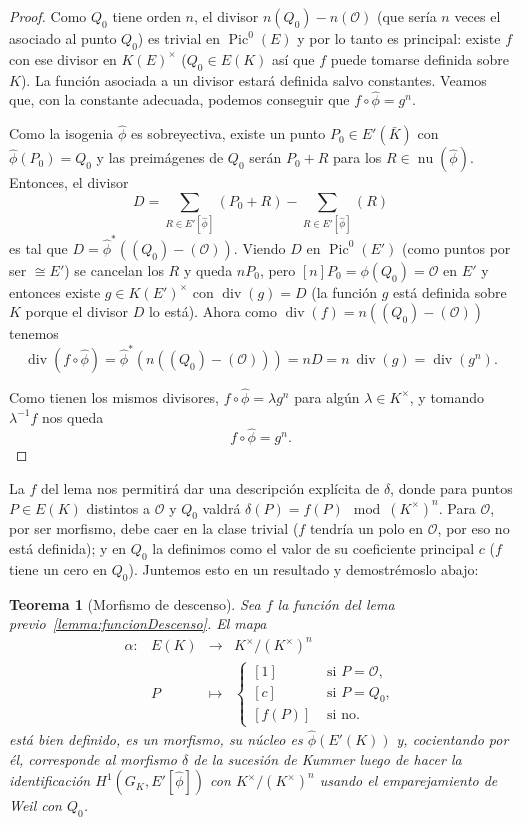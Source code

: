 \documentclass[a4paper]{book}
\theoremstyle{definition}
\theoremstyle{plain}
\newtheorem{theorem}[definition]{Teorema}
\DeclareMathOperator{\nuc}{nu}
\newcommand{\OO}{\mathcal{O}}
\newcommand{\KmodN}{K^\times/{(K^\times)}^n}
\begin{document}
\begin{proof}
Como $Q_0$ tiene orden $n$, el divisor $n(Q_0)- n(\OO)$ (que sería $n$ veces el asociado al punto $Q_0$) es trivial en $\operatorname{Pic}^0(E)$ y por lo tanto es principal: existe $f$ con ese divisor en ${K(E)}^\times$ ($Q_0\in E(K)$ así que $f$ puede tomarse definida sobre $K$). La función asociada a un divisor estará definida salvo constantes. Veamos que, con la constante adecuada, podemos conseguir que $f\circ\hat\phi=g^n$.

Como la isogenia $\hat\phi$ es sobreyectiva, existe un punto $P_0 \in E'(\bar{K})$ con $\hat\phi(P_0)=Q_0$ y las preimágenes de $Q_0$ serán $P_0 + R$ para los $R\in \nuc (\hat\phi)$. Entonces, el divisor 
\[ 
D = \sum_{R\in E'[\hat\phi]} (P_0 + R) - \sum_{R\in E'[\hat\phi]} (R) 
\] 
es tal que $D = \hat\phi^*((Q_0)-(\OO))$. Viendo $D$ en $\operatorname{Pic}^0(E')$ (como puntos por ser $\cong E'$) se cancelan los $R$ y queda $nP_0$, pero $[n]P_0 = \phi(Q_0) = \OO$ en $E'$ y entonces existe $g \in {K(E')}^\times$ con $\operatorname{div}(g) = D$ (la función $g$ está definida sobre $K$ porque el divisor $D$ lo está). Ahora como $\operatorname{div}(f)= n((Q_0)-(\OO))$ tenemos
\[
\operatorname{div}(f \circ \hat\phi)=\hat\phi^*(n((Q_0)-(\OO)))=n D=n\ \operatorname{div}(g)=\operatorname{div}(g^n).
\]

Como tienen los mismos divisores, $f\circ\hat\phi = \lambda g^n$ para algún $\lambda \in K^\times$, y tomando $\lambda^{-1}f$ nos queda
\[
f\circ\hat\phi = g^n.
\]
\end{proof}

La $f$ del lema nos permitirá dar una descripción explícita de $\delta$, donde para puntos $P\in E(K)$ distintos a $\OO$ y $Q_0$ valdrá $\delta(P)=f(P) \mod {(K^\times)}^n$. Para $\OO$, por ser morfismo, debe caer en la clase trivial ($f$ tendría un polo en $\OO$, por eso no está definida); y en $Q_0$ la definimos como el valor de su coeficiente principal $c$ ($f$ tiene un cero en $Q_0$). Juntemos esto en un resultado y demostrémoslo abajo:

\begin{theorem}[Morfismo de descenso]\label{thm:morfismoDescenso}
Sea $f$ la función del lema previo~\ref{lemma:funcionDescenso}. El mapa
\[
\begin{array}{crcl}
\alpha:&E(K) & \longrightarrow & \KmodN \\
&P & \longmapsto &
\begin{cases}
[1] & \text{ si } P=\OO, \\
[c] & \text{ si } P=Q_0, \\
[f(P)] & \text{ si no.}
\end{cases}
\end{array}
\]
está bien definido, es un morfismo, su núcleo es $\hat\phi(E'(K))$ y, cocientando por él, corresponde al morfismo $\delta$ de la sucesión de Kummer luego de hacer la identificación $H^1(G_K, E'[\hat\phi])$ con $\KmodN$ usando el emparejamiento de Weil con $Q_0$.
\end{theorem}
\end{document}
